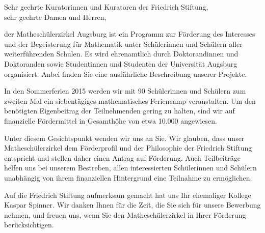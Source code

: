 \documentclass{zirkelbrief}
\begin{document}
\renewcommand{\anschrift}{%
      Friedrich Stiftung \\
      Schiffgraben 42 \\
      30175 Hannover \\}
\renewcommand{\datum}{\today}
\renewcommand{\betreff}{Matheschülerzirkel Augsburg}
\renewcommand{\absender}{%
      \textbf{Ingo Blechschmidt} \\
      \ \\
      Lehrstuhl für Algebra und Zahlentheorie \\
      Universitätsstr. 14 \\
      86159 Augsburg \\
      \ \\
      Telefon \> +49 (0) 821 598 -- 5601 \\
      Telefax \> +49 (0) 821 598 -- 2090 \\
      \textsf{blechschmidt@math.uni-augsburg.de} \\}

\makeletterhead

Sehr geehrte Kuratorinnen und Kuratoren der Friedrich Stiftung, \\
sehr geehrte Damen und Herren,

der Matheschülerzirkel Augsburg ist ein Programm zur Förderung
des Interesses und der Begeisterung für Mathematik unter Schülerinnen und
Schülern aller weiterführenden Schulen. Es wird ehrenamtlich durch Doktorandinnen und
Doktoranden sowie Studentinnen und Studenten der Universität Augsburg
organisiert. Anbei finden Sie eine ausführliche Beschreibung unserer Projekte.

In den Sommerferien 2015 werden wir mit 90 Schülerinnen und Schülern zum
zweiten Mal ein siebentägiges mathematisches Feriencamp veranstalten. Um den
benötigten Eigenbeitrag der Teilnehmenden gering zu halten, sind wir auf
finanzielle Fördermittel in Gesamthöhe von etwa 10.000 \texteuro{} angewiesen.

Unter diesem Gesichtspunkt wenden wir uns an Sie. Wir glauben, dass unser
Mathe\-schü\-ler\-zir\-kel dem Förderprofil und der Philosophie der Friedrich
Stiftung entspricht und stellen daher einen Antrag auf Förderung. Auch Teilbeiträge
helfen uns bei unserem Bestreben, allen interessierten Schülerinnen und
Schülern unabhängig von ihrem finanziellen Hintergrund eine Teilnahme zu
ermöglichen.

Auf die Friedrich Stiftung aufmerksam gemacht hat uns Ihr  
ehemaliger Kollege Kaspar Spinner. Wir danken Ihnen für die Zeit, die Sie sich
für unsere Bewerbung nehmen, und freuen uns, wenn Sie den Matheschülerzirkel
in Ihrer Förderung berücksichtigen.
\end{document}
